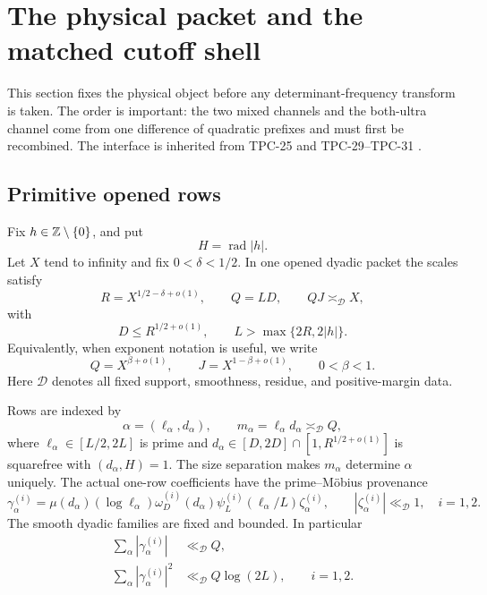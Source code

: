 \section{The physical packet and the matched cutoff shell}
\label{sec:tpc32-physical-shell}

This section fixes the physical object before any determinant-frequency
transform is taken.  The order is important: the two mixed channels and
the both-ultra channel come from one difference of quadratic prefixes and
must first be recombined.  The interface is inherited from
TPC-25 and TPC-29--TPC-31
\citep{WangTPC25,WangTPC29,WangTPC30,WangTPC31}.

\subsection{Primitive opened rows}

Fix \(h\in\mathbb Z\setminus\{0\}\), and put
\begin{equation}
 H=\operatorname{rad}|h|.
 \label{eq:tpc32-H}
\end{equation}
Let \(X\) tend to infinity and fix \(0<\delta<1/2\).  In one opened
dyadic packet the scales satisfy
\begin{equation}
 R=X^{1/2-\delta+o(1)},\qquad
 Q=LD,\qquad QJ\asymp_{\mathscr D}X,
 \label{eq:tpc32-physical-scales}
\end{equation}
with
\begin{equation}
 D\le R^{1/2+o(1)},\qquad
 L>\max\{2R,2|h|\}.
 \label{eq:tpc32-row-separation}
\end{equation}
Equivalently, when exponent notation is useful, we write
\begin{equation}
 Q=X^{\beta+o(1)},\qquad
 J=X^{1-\beta+o(1)},\qquad 0<\beta<1.
 \label{eq:tpc32-beta-scales}
\end{equation}
Here \(\mathscr D\) denotes all fixed support, smoothness, residue, and
positive-margin data.

Rows are indexed by
\begin{equation}
 \alpha=(\ell_\alpha,d_\alpha),\qquad
 m_\alpha=\ell_\alpha d_\alpha\asymp_{\mathscr D}Q,
 \label{eq:tpc32-row-index}
\end{equation}
where \(\ell_\alpha\in[L/2,2L]\) is prime and
\(d_\alpha\in[D,2D]\cap[1,R^{1/2+o(1)}]\) is squarefree with
\((d_\alpha,H)=1\).  The size separation makes \(m_\alpha\) determine
\(\alpha\) uniquely.  The actual one-row coefficients have the
prime--M\"obius provenance
\begin{equation}
 \gamma_\alpha^{(i)}
 =\mu(d_\alpha)(\log\ell_\alpha)
  \omega_D^{(i)}(d_\alpha)
  \psi_L^{(i)}(\ell_\alpha/L)\zeta_\alpha^{(i)},
 \qquad |\zeta_\alpha^{(i)}|\ll_{\mathscr D}1,
 \quad i=1,2.
 \label{eq:tpc32-row-provenance}
\end{equation}
The smooth dyadic families are fixed and bounded.  In particular
\begin{align}
 \sum_\alpha|\gamma_\alpha^{(i)}|
 &\ll_{\mathscr D}Q,
 \label{eq:tpc32-row-l1}\\
 \sum_\alpha|\gamma_\alpha^{(i)}|^2
 &\ll_{\mathscr D}Q\log(2L),
 \qquad i=1,2.
 \label{eq:tpc32-row-l2}
\end{align}

